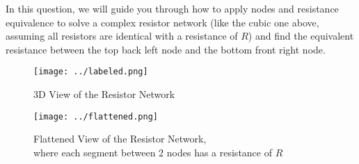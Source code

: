 In this question, we will guide you through how to apply nodes and resistance equivalence to solve a complex resistor network (like the cubic one above, assuming all resistors are identical with a resistance of $R$) and find the equivalent resistance between the top back left node and the bottom front right node. \\

\begin{figure}[H]
    \centering
    \texttt{[image: ../labeled.png]}
    \caption{3D View of the Resistor Network}
\end{figure}

\begin{figure}[H]
    \centering
    \texttt{[image: ../flattened.png]}
    \caption{Flattened View of the Resistor Network, \\ where each segment between 2 nodes has a resistance of $R$}
\end{figure}

